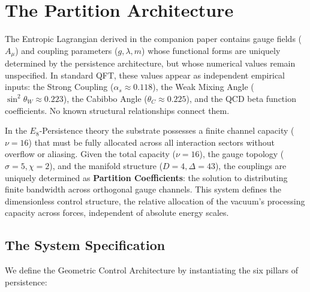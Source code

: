 \section{The Partition Architecture}
\label{sec:partition_architecture}

The Entropic Lagrangian derived in the companion paper contains gauge fields ($A_\mu$) and coupling parameters ($g, \lambda, m$) whose functional forms are uniquely determined by the persistence architecture, but whose numerical values remain unspecified. In standard QFT, these values appear as independent empirical inputs: the Strong Coupling ($\alpha_s \approx 0.118$), the Weak Mixing Angle ($\sin^2\theta_W \approx 0.223$), the Cabibbo Angle ($\theta_C \approx 0.225$), and the QCD beta function coefficients. No known structural relationships connect them.

In the $E_8$-Persistence theory the substrate possesses a finite channel capacity ($\nu = 16$) that must be fully allocated across all interaction sectors without overflow or aliasing. Given the total capacity ($\nu=16$), the gauge topology ($\sigma=5, \chi=2$), and the manifold structure ($D=4, \Delta=43$), the couplings are uniquely determined as \textbf{Partition Coefficients}: the solution to distributing finite bandwidth across orthogonal gauge channels. This system defines the dimensionless control structure, the relative allocation of the vacuum's processing capacity across forces, independent of absolute energy scales.

\subsection{The System Specification}

We define the Geometric Control Architecture by instantiating the six pillars of persistence:

